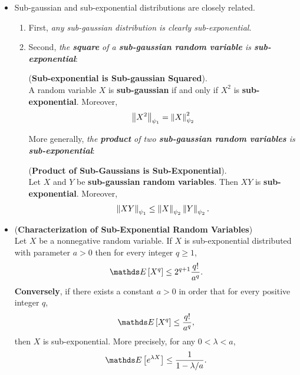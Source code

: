 \documentclass[11pt]{article}
\begin{document}
\begin{itemize}
\item \begin{remark}
Sub-gaussian and sub-exponential distributions are closely related. 
\begin{enumerate}
\item First, \emph{any sub-gaussian distribution is clearly sub-exponential}. 
\item Second, \emph{the \textbf{square} of a \textbf{sub-gaussian random variable} is \textbf{sub-exponential}}:
\begin{lemma} (\textbf{Sub-exponential is Sub-gaussian Squared}).  \citep{vershynin2018high}\\
A random variable  $X$ is \textbf{sub-gaussian} if and only if $X^2$ is \textbf{sub-exponential}. Moreover,
\begin{align*}
\left\|X^2\right\|_{\psi_1} = \left\|X\right\|_{\psi_2}^2
\end{align*}
\end{lemma}

More generally, \emph{the \textbf{product} of two \textbf{sub-gaussian random variables} is \textbf{sub-exponential}}:
\begin{lemma} (\textbf{Product of Sub-Gaussians is Sub-Exponential}).  \citep{vershynin2018high}\\
Let $X$ and $Y$ be \textbf{sub-gaussian random variables}. Then $XY$ is \textbf{sub-exponential}. Moreover,
\begin{align*}
\left\|XY\right\|_{\psi_1} \le \left\|X\right\|_{\psi_2} \left\|Y\right\|_{\psi_2}.
\end{align*}
\end{lemma}
\end{enumerate}
\end{remark}

\item \begin{proposition} (\textbf{Characterization of Sub-Exponential Random Variables})  \citep{boucheron2013concentration}\\
Let $X$ be a nonnegative random variable. If $X$ is sub-exponential distributed with parameter $a > 0$ 
then for every integer $q \ge 1$,
\begin{align}
\E{}{X^{q}} \le 2^{q+1}\frac{q!}{a^q}. \label{eqn: sub_exponential_power_moment}
\end{align}
\textbf{Conversely}, if there exists a constant $a > 0$ in order that for every positive integer $q$,
\begin{align*}
\E{}{X^{q}} \le  \frac{q!}{a^q},
\end{align*} then $X$ is sub-exponential. More precisely, for any $0 < \lambda < a$, 
\begin{align*}
\E{}{e^{\lambda X}} \le \frac{1}{1 - \lambda /a}.
\end{align*}
\end{proposition}


\end{itemize}
\end{document}
